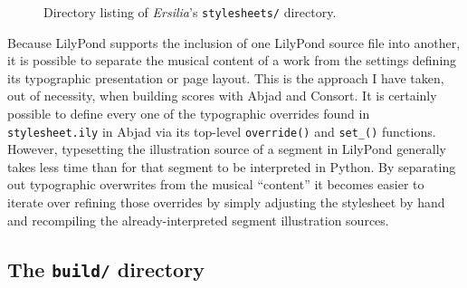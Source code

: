 \begin{figure}[h!]
\begin{singlespacing}
\vspace{-0.5\baselineskip}
\end{singlespacing}
\caption{
Directory listing of \emph{Ersilia}'s \texttt{stylesheets/} directory.
}
\end{figure}

Because LilyPond supports the inclusion of one LilyPond source file into
another, it is possible to separate the musical content of a work from the
settings defining its typographic presentation or page layout. This is the
approach I have taken, out of necessity, when building scores with Abjad and
Consort. It is certainly possible to define every one of the typographic
overrides found in \texttt{stylesheet.ily} in Abjad via its top-level
\texttt{override()} and \texttt{set\_()} functions. However, typesetting the
illustration source of a segment in LilyPond generally takes less time than for
that segment to be interpreted in Python. By separating out typographic
overwrites from the musical \enquote{content} it becomes easier to iterate over
refining those overrides by simply adjusting the stylesheet by hand and
recompiling the already-interpreted segment illustration sources.

\subsection{The \texttt{build/} directory}
\label{ssec:the-build-directory}


